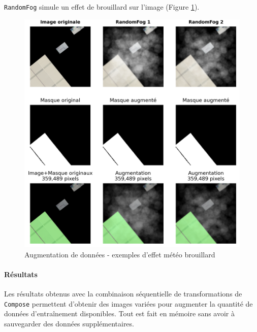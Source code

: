 \newpage
\texttt{RandomFog} simule un effet de brouillard sur l'image (Figure \ref{fig:ch36_augmentations_13_effets_meteo_brouillard}).
\begin{figure}[H]
    \centering
    \includegraphics[width=1\linewidth]{02-main/figures/ch3/ch36_augmentations_13_effets_meteo_brouillard.png}
    \caption{Augmentation de données - exemples d'effet météo brouillard}
    \label{fig:ch36_augmentations_13_effets_meteo_brouillard}
\end{figure}

\paragraph{Résultats}
Les résultats obtenus avec la combinaison séquentielle de transformations de \texttt{Compose} permettent d'obtenir des images variées pour augmenter la quantité de données d'entraînement disponibles. Tout est fait en mémoire sans avoir à sauvegarder des données supplémentaires.

